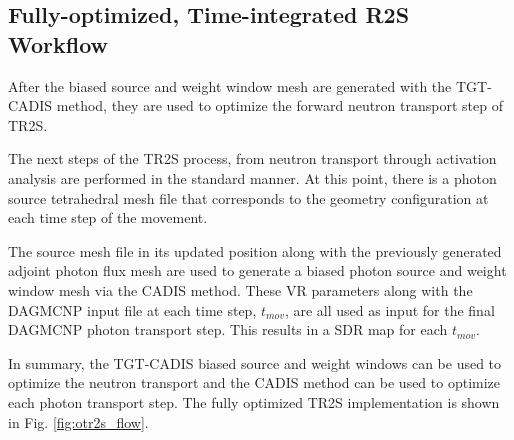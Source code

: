 \subsection{Fully-optimized, Time-integrated R2S Workflow}
After the biased source and weight window mesh are generated with the TGT-CADIS
method, they are used to optimize the forward neutron transport step of TR2S.

The next steps of the TR2S process, from neutron transport through activation
analysis are performed in the standard manner.  At this point, there is a
photon source tetrahedral mesh file that corresponds to the 
geometry configuration at each time step of the movement.

The source mesh file in its updated position along with the previously
generated adjoint photon flux mesh are used to generate a biased photon source 
and weight window mesh via the CADIS method. 
These VR parameters along with the DAGMCNP input file %
at each time step,
$t_{mov}$, are all used 
as input for the final DAGMCNP photon transport step.  This results in
a SDR map for each $t_{mov}$.  

In summary, the TGT-CADIS biased source and weight windows can be used to optimize the 
neutron transport and the CADIS method can be used to optimize each photon
transport step.  The fully optimized TR2S implementation is shown in Fig.
\ref{fig:otr2s_flow}.

 

